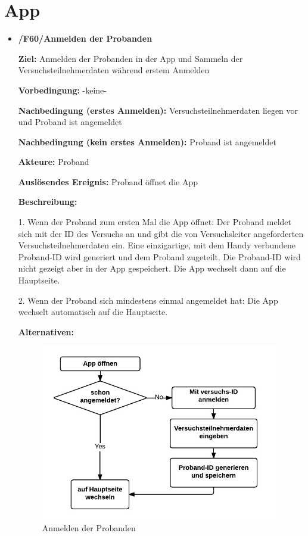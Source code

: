 \documentclass[a4paper]{scrreprt}
\begin{document}
    \newpage
    \section{App}

        \begin{itemize}
            \item \textbf{/F60/Anmelden der Probanden}

				\par \textbf{Ziel: }Anmelden der Probanden in der App und Sammeln der Versuchsteilnehmerdaten während erstem Anmelden
				\par \textbf{Vorbedingung: }-keine-
				\par \textbf{Nachbedingung (erstes Anmelden): }Versuchsteilnehmerdaten liegen vor und Proband ist angemeldet
				\par \textbf{Nachbedingung (kein erstes Anmelden): }Proband ist angemeldet
				\par \textbf{Akteure: }Proband
				\par \textbf{Auslösendes Ereignis: }Proband öffnet die App
				\par \textbf{Beschreibung: }
				\par 1. Wenn der Proband zum ersten Mal die App öffnet: Der Proband meldet sich mit der ID des Versuchs an und gibt die
				 von Versuchsleiter angeforderten Versuchsteilnehmerdaten ein. Eine einzigartige, mit dem Handy verbundene Proband-ID wird generiert und dem Proband zugeteilt. Die Proband-ID wird nicht gezeigt aber in der App gespeichert. Die App wechselt dann auf die Hauptseite.
				\par 2. Wenn der Proband sich mindestens einmal angemeldet hat: Die App wechselt automatisch auf die Hauptseite.
				\par \textbf{Alternativen: }
				\begin{figure}[ht]
					\centering
					\includegraphics[scale=1]{AppAnmelden.jpeg}
					\caption{Anmelden der Probanden}
				\end{figure}
								


\end{itemize}
\end{document}
